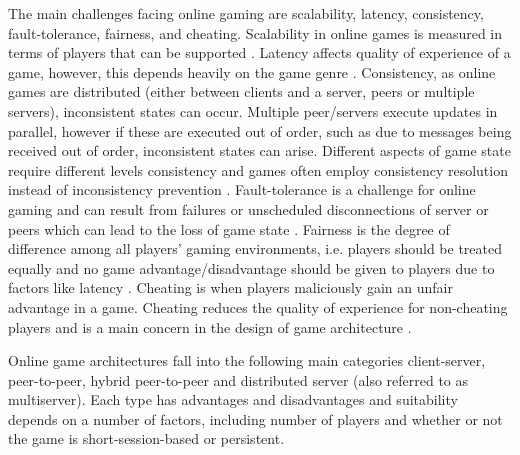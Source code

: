 The main challenges facing online gaming are scalability, latency, consistency, fault-tolerance, fairness, and cheating.
Scalability in online games is measured in terms of players that can be supported \cite{turchini2015scalability}.
Latency affects quality of experience of a game, however, this depends heavily on the game genre \cite{LatencyandPlayerActions}.
Consistency, as online games are distributed (either between clients and a server, peers or multiple servers), inconsistent states can occur. Multiple peer/servers execute updates in parallel, however if these are executed out of order, such as due to messages being received out of order, inconsistent states can arise.  Different aspects of game state require different levels consistency and games often employ consistency resolution instead of inconsistency prevention \cite{P2PSurvey}.
Fault-tolerance is a challenge for online gaming and can result from failures or unscheduled disconnections of server or peers which can lead to the loss of game state \cite{P2PSurvey}.
Fairness is the degree of difference among all players’ gaming environments, i.e. players should be treated equally and no game advantage/disadvantage should be given to players due to factors like latency \cite{P2PSurvey}.
Cheating is when players maliciously gain an unfair advantage in a game. Cheating reduces the quality of experience for non-cheating players and is a main concern in the design of game architecture \cite{P2PSurvey}. 

Online game architectures fall into the following main categories client-server, peer-to-peer, hybrid peer-to-peer and distributed server (also referred to as multiserver). Each type has advantages and disadvantages and suitability depends on a number of factors, including number of players and whether or not the game is short-session-based or persistent.


